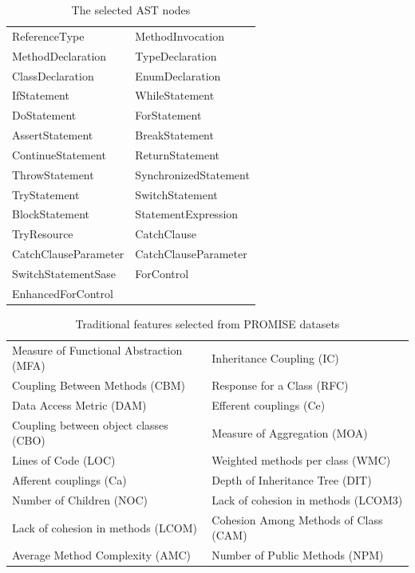 \documentclass[journal]{IEEEtran}
\begin{document}
\begin{table}[htbp]
	\footnotesize
	\caption{The selected AST nodes}
	\label{tab2}
	\tabcolsep 22pt
	\centering
	\begin{tabular}{ll}
		\toprule
		ReferenceType        & MethodInvocation \\
		MethodDeclaration    & TypeDeclaration\\
		ClassDeclaration     & EnumDeclaration\\
		IfStatement          & WhileStatement        \\
		DoStatement          & ForStatement          \\
		AssertStatement      & BreakStatement        \\
		ContinueStatement    & ReturnStatement       \\
		ThrowStatement       & SynchronizedStatement \\
		TryStatement         & SwitchStatement       \\
		BlockStatement       & StatementExpression   \\
		TryResource          & CatchClause           \\
		CatchClauseParameter & CatchClauseParameter  \\
		SwitchStatementSase  & ForControl            \\
		EnhancedForControl   &                \\
		\bottomrule
	\end{tabular}
\end{table}


\begin{table}[htbp]
	\footnotesize
	\caption{Traditional features selected from PROMISE datasets}
	\label{tab3}
	\tabcolsep 50pt
	\centering
	\begin{tabular}{ll}
		\toprule
		Measure of Functional Abstraction (MFA) & Inheritance Coupling (IC)             \\
		Coupling Between Methods (CBM)          & Response for a Class (RFC)            \\
		Data Access Metric (DAM)                & Efferent couplings (Ce)               \\
		Coupling between object classes (CBO)   & Measure of Aggregation (MOA)          \\
		Lines of Code (LOC)                     & Weighted methods per class (WMC)      \\
		Afferent couplings (Ca)                 & Depth of Inheritance Tree (DIT)       \\
		Number of Children (NOC)                & Lack of cohesion in methods (LCOM3)   \\
		Lack of cohesion in methods (LCOM)      & Cohesion Among Methods of Class (CAM) \\
		Average Method Complexity (AMC)         & Number of Public Methods (NPM)\\
		\bottomrule
	\end{tabular}
\end{table}
\end{document}
